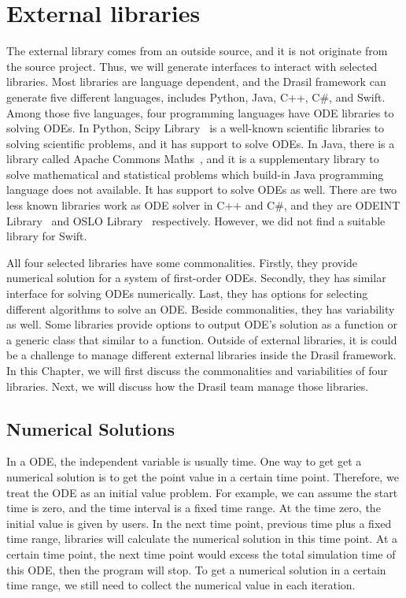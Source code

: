 \chapter{External libraries}
The external library comes from an outside source, and it is not originate from the source project. Thus, we will generate interfaces to interact with selected libraries. Most libraries are language dependent, and the Drasil framework can generate five different languages, includes Python, Java, C++, C\#, and Swift. Among those five languages, four programming languages have ODE libraries to solving ODEs. In Python, Scipy Library~\citep{scipy} is a well-known scientific libraries to solving scientific problems, and it has support to solve ODEs. In Java, there is a library called Apache Commons Maths~\citep{apache}, and it is a supplementary library to solve mathematical and statistical problems which build-in Java programming language does not available. It has support to solve ODEs as well. There are two less known libraries work as ODE solver in C++ and C\#, and they are ODEINT Library~\citep{odeint} and OSLO Library~\citep{oslo} respectively. However, we did not find a suitable library for Swift. 

All four selected libraries have some commonalities. Firstly, they provide numerical solution for a system of first-order ODEs. Secondly, they has similar interface for solving ODEs numerically. Last, they has options for selecting different algorithms to solve an ODE. Beside commonalities, they has variability as well. Some libraries provide options to output ODE's solution as a function or a generic class that similar to a function. Outside of external libraries, it is could be a challenge to manage different external libraries inside the Drasil framework. In this Chapter, we will first discuss the commonalities and variabilities of four libraries. Next, we will discuss how the Drasil team manage those libraries.

\section{Numerical Solutions}
In a ODE, the independent variable is usually time. One way to get get a numerical solution is to get the point value in a certain time point. Therefore, we treat the ODE as an initial value problem. For example, we can assume the start time is zero, and the time interval is a fixed time range. At the time zero, the initial value is given by users. In the next time point, previous time plus a fixed time range, libraries will calculate the numerical solution in this time point. At a certain time point, the next time point would excess the total simulation time of this ODE, then the program will stop. To get a numerical solution in a certain time range, we still need to collect the numerical value in each iteration. 


